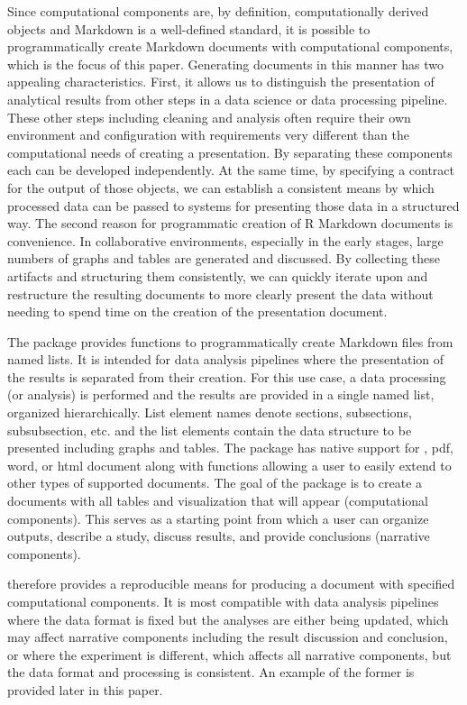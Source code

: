 \documentclass[
]{jss}
\begin{document}
Since computational components are, by definition, computationally
derived objects and  Markdown is a well-defined standard, it
is possible to programmatically create  Markdown documents
with computational components, which is the focus of this paper.
Generating documents in this manner has two appealing characteristics.
First, it allows us to distinguish the presentation of analytical
results from other steps in a data science or data processing pipeline.
These other steps including cleaning and analysis often require their
own environment and configuration with requirements very different than
the computational needs of creating a presentation. By separating these
components each can be developed independently. At the same time, by
specifying a contract for the output of those objects, we can establish
a consistent means by which processed data can be passed to systems for
presenting those data in a structured way. The second reason for
programmatic creation of R Markdown documents is convenience. In
collaborative environments, especially in the early stages, large
numbers of graphs and tables are generated and discussed. By collecting
these artifacts and structuring them consistently, we can quickly
iterate upon and restructure the resulting documents to more clearly
present the data without needing to spend time on the creation of the
presentation document.

The  package provides functions to programmatically create
 Markdown files from named lists. It is intended for data
analysis pipelines where the presentation of the results is separated
from their creation. For this use case, a data processing (or analysis)
is performed and the results are provided in a single named list,
organized hierarchically. List element names denote sections,
subsections, subsubsection, etc. and the list elements contain the data
structure to be presented including graphs and tables. The package has
native support for  \citep{blischak2019}, pdf, word, or
html document along with functions allowing a user to easily extend to
other types of supported documents. The goal of the package is to create
a documents with all tables and visualization that will appear
(computational components). This serves as a starting point from which a
user can organize outputs, describe a study, discuss results, and
provide conclusions (narrative components).

 therefore provides a reproducible means for producing a
document with specified computational components. It is most compatible
with data analysis pipelines where the data format is fixed but the
analyses are either being updated, which may affect narrative components
including the result discussion and conclusion, or where the experiment
is different, which affects all narrative components, but the data
format and processing is consistent. An example of the former is
provided later in this paper.
\end{document}
